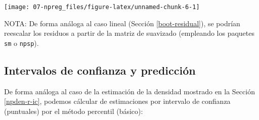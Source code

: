 \documentclass[
]{book}
\newenvironment{Shaded}{\begin{snugshade}}{\end{snugshade}}
\newcommand{\AttributeTok}[1]{\textcolor[rgb]{0.77,0.63,0.00}{#1}}
\newcommand{\DecValTok}[1]{\textcolor[rgb]{0.00,0.00,0.81}{#1}}
\newcommand{\FloatTok}[1]{\textcolor[rgb]{0.00,0.00,0.81}{#1}}
\newcommand{\FunctionTok}[1]{\textcolor[rgb]{0.00,0.00,0.00}{#1}}
\newcommand{\NormalTok}[1]{#1}
\newcommand{\OtherTok}[1]{\textcolor[rgb]{0.56,0.35,0.01}{#1}}
\newcommand{\SpecialCharTok}[1]{\textcolor[rgb]{0.00,0.00,0.00}{#1}}
\theoremstyle{break}
\theoremstyle{definition}
\theoremstyle{definition}
\theoremstyle{definition}
\theoremstyle{definition}
\theoremstyle{remark}
\begin{document}
\begin{center}\texttt{[image: 07-npreg\_files/figure-latex/unnamed-chunk-6-1]} \end{center}

NOTA: De forma análoga al caso lineal (Sección \ref{boot-residual}), se podrían reescalar los residuos a partir de la matriz de suavizado (empleando los paquetes \texttt{sm} o \texttt{npsp}).

\hypertarget{intervalos-de-confianza-y-predicciuxf3n}{%
\subsection{Intervalos de confianza y predicción}\label{intervalos-de-confianza-y-predicciuxf3n}}

De forma análoga al caso de la estimación de la densidad mostrado en la Sección \ref{npden-r-ic}, podemos cálcular de estimaciones por intervalo de confianza (puntuales) por el método percentil (básico):

\begin{Shaded}
\end{Shaded}
\end{document}
